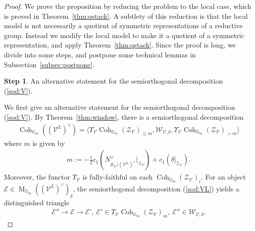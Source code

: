 \documentclass [11pt,oneside,a4paper,mathscr]{amsart}
\theoremstyle{definition}
\newtheorem{step}{Step}
\renewcommand{\leq}{\leqslant}
\newcommand{\E}{\mathcal{E}}
\newcommand{\sS}{\mathcal{S}}
\newcommand{\zZ}{\mathcal{Z}}
\newcommand{\V}{\mathcal{V}}
\newcommand{\MM}{\operatorname{M}}
\newcommand{\Coh}{\operatorname{Coh}}
\begin{document}
\begin{proof}
We prove the proposition by reducing the problem to
the local case, which is proved in Theorem~\ref{thm:qstack}. 
A subtlety of this reduction is that the local model is not necessarily  a 
quotient of symmetric representations of a reductive group. Instead we modify 
the local model to make it a quotient of a symmetric representation, and apply Theorem~\ref{thm:qstack}.
Since the proof is long, we divide into some steps, and postpone some technical lemmas in 
Subsection~\ref{subsec:postpone}.

\begin{step}
An alternative statement for the semiorthogonal decomposition (\ref{sod:V}).
\end{step}
We first give an alternative statement for the semiorthogonal decomposition (\ref{sod:V}). 
By Theorem~\ref{thm:window}, 
there is a semiorthogonal decomposition 
\begin{align}\label{sod:VL}
    \Coh_{\mathbb{G}_m}((\V^L)^{\vee})=\langle \Upsilon_{\V} \Coh_{\mathbb{G}_m}(\zZ_{\V})_{\leq m}, \mathcal{W}_{\V, \delta}, \Upsilon_{\V} \Coh_{\mathbb{G}_m}(\zZ_{\V})_{>m}\rangle
\end{align}
where $m$ is given by 
\begin{align*}
    m:= -\frac{1}{2} c_1 (N_{\sS_{\V}/(\V^L)^{\vee}}^{\vee}|_{\zZ_{\V}})+
    c_1(\delta|_{\zZ_{\V}}). 
\end{align*}
Moreover, the functor $\Upsilon_{\mathcal{V}}$ is fully-faithful on each $\Coh_{\mathbb{G}_m}(\mathcal{Z}_{\mathcal{V}})_i$.
For an object $\E \in \MM_{\mathbb{G}_m}((\V^L)^{\vee})_{\delta}$, 
the semiorthogonal decomposition (\ref{sod:VL}) yields 
a distinguished triangle 
\begin{align}\label{show:tri}
    \E'' \to \E \to \E', \ 
    \E' \in \Upsilon_{\V} \Coh_{\mathbb{G}_m}(\zZ_{\V})_{m}, \ \E'' \in \mathcal{W}_{\V, \delta}. 
\end{align}


\end{proof}
\end{document}
